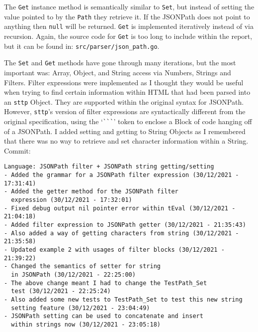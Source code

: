 The \verb|Get| instance method is semantically similar to \verb|Set|, but instead of setting the value pointed to by the \verb|Path| they retrieve it. If the JSONPath does not point to anything then \verb|null| will be returned. \verb|Get| is implemented iteratively instead of via recursion. Again, the source code for \verb|Get| is too long to include within the report, but it can be found in: \verb|src/parser/json_path.go|.

The \verb|Set| and \verb|Get| methods have gone through many iterations, but the most important was: Array, Object, and String access via Numbers, Strings and Filters. Filter expressions were implemented as I thought they would be useful when trying to find certain information within HTML that had been parsed into an \verb|sttp| Object. They are supported within the original syntax for JSONPath\textsuperscript{\cite{goessner_2007}}. However, \verb|sttp|'s version of filter expressions are syntactically different from the original specification, using the `\verb|```|' token to enclose a Block of code hanging off of a JSONPath. I added setting and getting to String Objects as I remembered that there was no way to retrieve and set character information within a String. Commit:

\begin{verbatim}
Language: JSONPath filter + JSONPath string getting/setting
- Added the grammar for a JSONPath filter expression (30/12/2021 - 17:31:41)
- Added the getter method for the JSONPath filter
  expression (30/12/2021 - 17:32:01)
- Fixed debug output nil pointer error within tEval (30/12/2021 - 21:04:18)
- Added filter expression to JSONPath getter (30/12/2021 - 21:35:43)
- Also added a way of getting characters from string (30/12/2021 - 21:35:58)
- Updated example 2 with usages of filter blocks (30/12/2021 - 21:39:22)
- Changed the semantics of setter for string
  in JSONPath (30/12/2021 - 22:25:00)
- The above change meant I had to change the TestPath_Set
  test (30/12/2021 - 22:25:24)
- Also added some new tests to TestPath_Set to test this new string
  setting feature (30/12/2021 - 23:04:49)
- JSONPath setting can be used to concatenate and insert
  within strings now (30/12/2021 - 23:05:18)
\end{verbatim}

